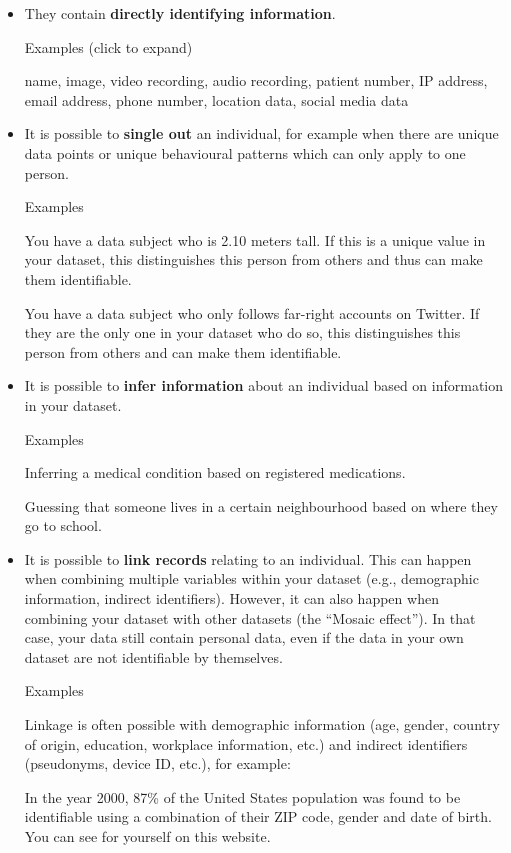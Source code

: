 \documentclass[
]{book}
\providecommand{\tightlist}{%
  \setlength{\itemsep}{0pt}\setlength{\parskip}{0pt}}
\begin{document}
\begin{itemize}
\tightlist
\item
  They contain \textbf{directly identifying information}.

  Examples (click to expand)

  name, image, video recording, audio recording, patient number, IP address,
  email address, phone number, location data, social media data
\item
  It is possible to \textbf{single out} an individual, for example when there are
  unique data points or unique behavioural patterns which can only apply to one
  person.

  Examples

  You have a data subject who is 2.10 meters tall. If this is a unique
  value in your dataset, this distinguishes this person from others and thus
  can make them identifiable.

  You have a data subject who only follows far-right accounts on Twitter.
  If they are the only one in your dataset who do so, this distinguishes this
  person from others and can make them identifiable.
\item
  It is possible to \textbf{infer information} about an individual based on information
  in your dataset.

  Examples

  Inferring a medical condition based on registered medications.

  Guessing that someone lives in a certain neighbourhood based on where they go to school.
\item
  It is possible to \textbf{link records} relating to an individual. This can happen
  when combining multiple variables within your dataset (e.g., demographic
  information, indirect identifiers). However, it can also happen when combining
  your dataset with other datasets (the ``Mosaic effect''). In that case, your data
  still contain personal data, even if the data in your own dataset are not
  identifiable by themselves.

  Examples

  Linkage is often possible with demographic information (age,
  gender, country of origin, education, workplace information, etc.) and
  indirect identifiers (pseudonyms, device ID, etc.), for example:

  In the year 2000, 87\% of the United States population
  was found to be identifiable using a combination of their ZIP code, gender
  and date of birth. You can see for yourself on
  this website.


\end{itemize}
\end{document}
